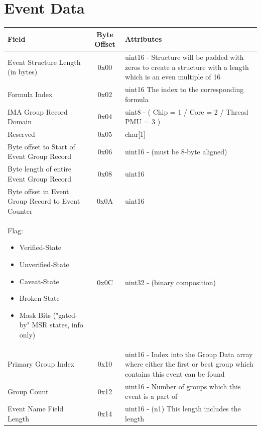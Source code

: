 \documentclass[14]{article}
\begin{document}
\section{Event Data}
\begin{tabular}[l]{|p{5cm}|c|p{7cm}|}
  \hline
  \textbf{Field} & \textbf{Byte Offset} & \textbf{Attributes} \\
  \hline
  Event Structure Length (in bytes) & 0x00 & uint16 - Structure will be padded 
                                             with zeros to create a structure
                                             with a length which is an even
                                             multiple of 16 \\
  \hline
  Formula Index & 0x02 & uint16 The index to the corresponding formula \\
  \hline
  IMA Group Record Domain & 0x04 & uint8 - ( Chip = 1 / Core = 2 / Thread PMU = 3
                                   ) \\
  \hline
  Reserved & 0x05 & char[1] \\
  \hline
  Byte offset to Start of Event Group Record & 0x06 & uint16 - (must be 8-byte
                                                      aligned) \\
  \hline
  Byte length of entire Event Group Record & 0x08 & uint16 \\
  \hline
  Byte offset in Event Group Record to Event Counter & 0x0A & uint16 \\
  \hline
  \parbox[t]{5cm} {
  Flag:
  \begin{itemize}
    \renewcommand\labelitemi{--}
    \setlength\itemsep{-0.4em}
    \item Verified-State
    \item Unverified-State
    \item Caveat-State
    \item Broken-State
    \item Mask Bits ("gated-by" MSR states, info only)
    \end{itemize}
  } & 0x0C & uint32 - (binary composition) \\
  \hline
  Primary Group Index & 0x10 & uint16 - Index into the Group Data array where
                               either the first or best group which contains this
                               event can be found \\
  \hline
  Group Count & 0x12 & uint16 - Number of groups which this event is a part of \\
  \hline
  Event Name Field Length & 0x14 & uint16 - (n1) This length includes the length

\end{tabular}
\end{document}
